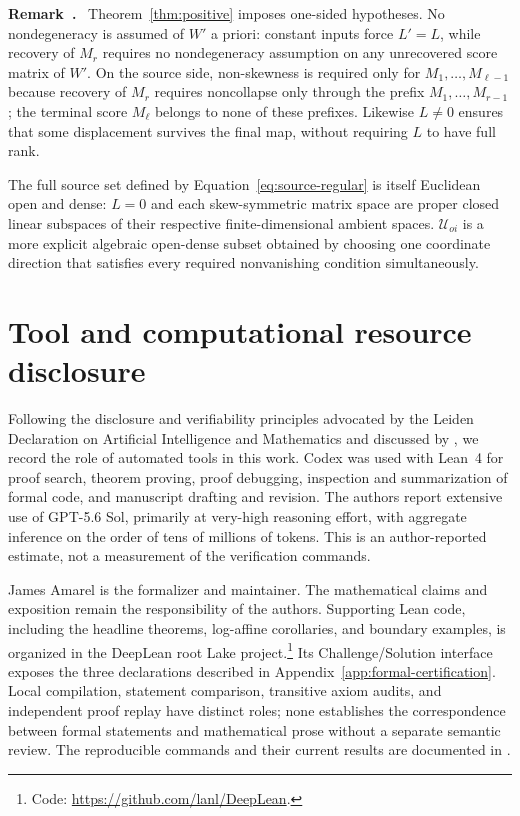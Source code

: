 \documentclass[mlmain]{jmlr}
\newcommand{\cU}{\mathcal{U}}
\newcounter{myremark}
\newenvironment{myremark}
  {\refstepcounter{myremark}%
   \par\medskip
   \noindent\textbf{Remark~\themyremark.}\ }
  {\par\medskip}
\begin{document}
\begin{myremark}
Theorem~\ref{thm:positive} imposes one-sided hypotheses.  No nondegeneracy is
assumed of $W'$ a priori: constant inputs force $L'=L$, while recovery of
$M_r$ requires no nondegeneracy assumption on any unrecovered score matrix of
$W'$.  On the source side, non-skewness is required only for
$M_1,\ldots,M_{\ell-1}$ because recovery of $M_r$ requires noncollapse
only through the prefix $M_1,\ldots,M_{r-1}$; the terminal score $M_\ell$
belongs to none of these prefixes.  Likewise $L\ne0$ ensures that some displacement survives
the final map, without requiring $L$ to have full rank.

The full source set defined by Equation~\eqref{eq:source-regular} is itself
Euclidean open and dense: $L=0$ and each skew-symmetric matrix space are
proper closed linear subspaces of their respective finite-dimensional
ambient spaces.  $\cU_{oi}$ is a more explicit algebraic open-dense
subset obtained by choosing one coordinate direction that satisfies every
required nonvanishing condition simultaneously.  
\end{myremark}

\section{Tool and computational resource disclosure}
\label{sec:ai-disclosure}

Following the disclosure and verifiability principles advocated by the
Leiden Declaration on Artificial Intelligence and Mathematics
\citep{leiden2026} and discussed by \citet{tao2026ai}, we record the role of
automated tools in this work. Codex was used with Lean~4 for proof search,
theorem proving, proof debugging, inspection and summarization of formal code,
and manuscript drafting and revision. The authors report extensive use of
GPT-5.6 Sol, primarily at very-high reasoning effort, with aggregate inference
on the order of tens of millions of tokens. This is an author-reported estimate,
not a measurement of the verification commands.

James Amarel is the formalizer and maintainer. The mathematical claims and
exposition remain the responsibility of the authors. Supporting Lean code,
including the headline theorems, log-affine corollaries, and boundary examples,
is organized in the DeepLean root Lake project.\footnote{Code: \url{https://github.com/lanl/DeepLean}.} Its Challenge/Solution
interface exposes the three declarations described in
Appendix~\ref{app:formal-certification}. Local compilation, statement comparison,
transitive axiom audits, and independent proof replay have distinct roles;
none establishes the correspondence between formal statements and mathematical
prose without a separate semantic review. The reproducible commands and their
current results are documented in .
\end{document}
